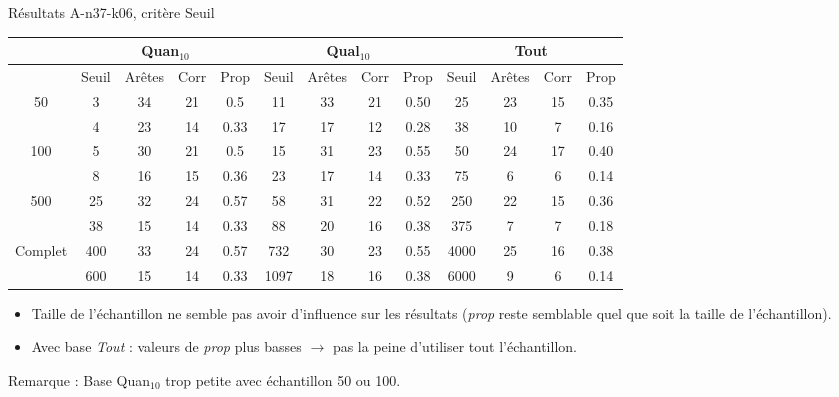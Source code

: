\documentclass{beamer}
\begin{document}
\begin{frame}{Résultats A-n37-k06, critère Seuil}

\begin{table}[H]

\begin{tabular}{|@{}c@{}|@{}c@{}|@{}c@{}|@{}c@{}|@{}c@{}||@{}c@{}|@{}c@{}|@{}c@{}|@{}c@{}||@{}c@{}|@{}c@{}|@{}c@{}|@{}c@{}|}

\hline
 & \multicolumn{4}{c|}{Quan$_{10}$} & \multicolumn{4}{c|}{Qual$_{10}$} & \multicolumn{4}{c|}{Tout} \\
 \hline
 & Seuil & Arêtes & Corr & Prop & Seuil & Arêtes & Corr & Prop & Seuil & Arêtes & Corr & Prop \\
 \hline
 50 & 3 & 34 & 21 & 0.5 & 11 & 33 & 21 & 0.50 & 25 & 23 & 15 & 0.35 \\
 \cline{2-13} 
    & 4 & 23 & 14 & 0.33 & 17 & 17 & 12 & 0.28 & 38 & 10 & 7 & 0.16 \\
  \hline
   100 & 5 & 30 & 21 & 0.5 & 15 & 31 & 23 & 0.55 & 50 & 24 & 17 & 0.40 \\
 \cline{2-13} 
    & 8 & 16 & 15 & 0.36 & 23 & 17 & 14 & 0.33 & 75 & 6 & 6 & 0.14 \\
  \hline
   500 & 25 & 32 & 24 & 0.57 & 58 & 31 & 22 & 0.52 & 250 & 22 & 15 & 0.36 \\
 \cline{2-13} 
    & 38 & 15 & 14 & 0.33 & 88 & 20 & 16 & 0.38 & 375 & 7 & 7 & 0.18 \\
  \hline
   Complet & 400 & 33 & 24 & 0.57 & 732 & 30 & 23 & 0.55 & 4000 & 25 & 16 & 0.38 \\
 \cline{2-13} 
    & 600 & 15 & 14 & 0.33 & 1097 & 18 & 16 & 0.38 & 6000 & 9 & 6 & 0.14 \\
  \hline

\end{tabular}
\end{table}
\begin{itemize}
\item Taille de l'échantillon ne semble pas avoir d'influence sur les résultats (\emph{prop} reste semblable quel que soit la taille de l'échantillon).
\item Avec base \emph{Tout} : valeurs de \emph{prop} plus basses $\rightarrow$ pas la peine d'utiliser tout l'échantillon.
\end{itemize}

Remarque : Base Quan$_{10}$ trop petite avec échantillon 50 ou 100.


\end{frame}
\end{document}
